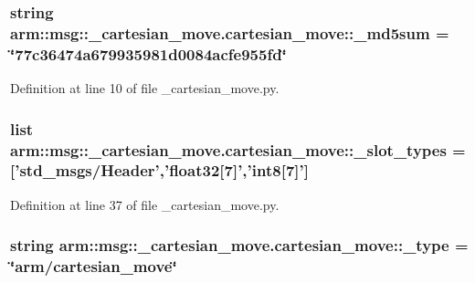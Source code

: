\subsubsection[{\-\_\-md5sum}]{\setlength{\rightskip}{0pt plus 5cm}string {\bf arm\-::msg\-::\-\_\-cartesian\-\_\-move.\-cartesian\-\_\-move\-::\-\_\-md5sum} = \char`\"{}77c36474a679935981d0084acfe955fd\char`\"{}\hspace{0.3cm}{\ttfamily  [static, private]}}\label{classarm_1_1msg_1_1__cartesian__move_1_1cartesian__move_a2f7be0be60abc6aaac7f07d947ede551}


\-Definition at line 10 of file \-\_\-cartesian\-\_\-move.\-py.

\subsubsection[{\-\_\-slot\-\_\-types}]{\setlength{\rightskip}{0pt plus 5cm}list {\bf arm\-::msg\-::\-\_\-cartesian\-\_\-move.\-cartesian\-\_\-move\-::\-\_\-slot\-\_\-types} = ['std\-\_\-msgs/\-Header','float32[7]','int8[7]']\hspace{0.3cm}{\ttfamily  [static, private]}}\label{classarm_1_1msg_1_1__cartesian__move_1_1cartesian__move_af3f50f338e8ce4f90b8c1973cf73cd62}


\-Definition at line 37 of file \-\_\-cartesian\-\_\-move.\-py.

\subsubsection[{\-\_\-type}]{\setlength{\rightskip}{0pt plus 5cm}string {\bf arm\-::msg\-::\-\_\-cartesian\-\_\-move.\-cartesian\-\_\-move\-::\-\_\-type} = \char`\"{}arm/{\bf cartesian\-\_\-move}\char`\"{}\hspace{0.3cm}{\ttfamily  [static, private]}}\label{classarm_1_1msg_1_1__cartesian__move_1_1cartesian__move_a73a21644a81e125d92486e82312565d8}


